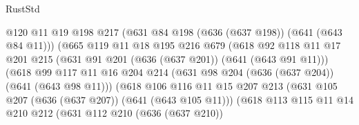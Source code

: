 \begin{lexlean}{RustStd}
\begin{coremodule}
                                    @120
                                    @11
                                    @19
                                    @198
                                    @217
                                    (@631 @84 @198 (@636 (@637 @198)) (@641 (@643 @84 @11)))
                                    (@665
                                      @119
                                      @11
                                      @18
                                      @195
                                      @216
                                      @679
                                      (@618
                                        @92
                                        @118
                                        @11
                                        @17
                                        @201
                                        @215
                                        (@631 @91 @201 (@636 (@637 @201)) (@641 (@643 @91 @11)))
                                        (@618
                                          @99
                                          @117
                                          @11
                                          @16
                                          @204
                                          @214
                                          (@631 @98 @204 (@636 (@637 @204)) (@641 (@643 @98 @11)))
                                          (@618
                                            @106
                                            @116
                                            @11
                                            @15
                                            @207
                                            @213
                                            (@631
                                              @105
                                              @207
                                              (@636 (@637 @207))
                                              (@641 (@643 @105 @11)))
                                            (@618
                                              @113
                                              @115
                                              @11
                                              @14
                                              @210
                                              @212
                                              (@631
                                                @112
                                                @210
                                                (@636 (@637 @210))

\end{coremodule}
\end{lexlean}
